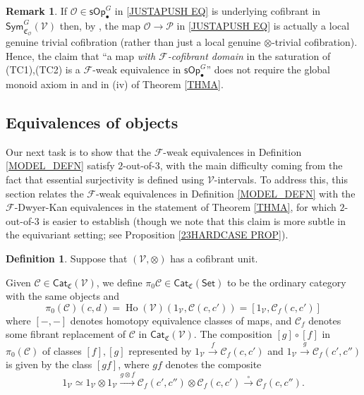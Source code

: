 \documentclass[a4paper,10pt
 ,final
]{article}%
\numberwithin{equation}{section}
\numberwithin{figure}{section}
\theoremstyle{definition} %
\newtheorem{definition}[equation]{Definition}%
\newtheorem{remark}[equation]{Remark}%
\newcommand{\Cat}{\mathsf{Cat}}
\DeclareMathOperator{\Ho}{Ho}
\newcommand{\F}{\ensuremath{\mathcal F}}
\newcommand{\V}{\ensuremath{\mathcal V}}
\renewcommand{\O}{\ensuremath{\mathcal O}}
\renewcommand{\P}{\ensuremath{\mathcal P}}
\newcommand{\1}{\ensuremath{\mathbbm 1}}%
\begin{document}
\begin{remark}\label{JCELLSM REM}
	If $\O \in \mathsf{sOp}^G_{\bullet}$
	in \eqref{JUSTAPUSH EQ}
	is underlying cofibrant in $\mathsf{Sym}^G_{\mathfrak{C}_{\O}}(\V)$
	then, by \cite[Rem. \ref{OC-THMISM REM}]{BP_FCOP},
	the map $\O \to \P$ in \eqref{JUSTAPUSH EQ}
	is actually a local genuine trivial cofibration 
	(rather than just a local genuine $\otimes$-trivial cofibration).
	Hence, the claim that 
	``a map \emph{with $\F$-cofibrant domain} in the saturation
	of (TC1),(TC2) is a $\F$-weak equivalence in
	$\mathsf{sOp}^G_{\bullet}$'' 
	does not require the global monoid axiom
	in \cite[Def. \ref{OC-GLOBMONAX_DEF}]{BP_FCOP}
	and in (iv) of Theorem \ref{THMA}.
\end{remark}







\subsection{Equivalences of objects}\label{EQUIVOBJ_SEC}


Our next task is to show that the
$\F$-weak equivalences
in Definition \ref{MODEL_DEFN}
satisfy $2$-out-of-$3$,
with the main difficulty coming 
from the fact that essential surjectivity is 
defined using $\V$-intervals.
%
To address this, this section relates the $\F$-weak equivalences
in Definition \ref{MODEL_DEFN} with the $\F$-Dwyer-Kan equivalences
in the statement of Theorem \ref{THMA},
for which $2$-out-of-$3$ is easier to establish
(though we note that this claim is more subtle in 
the equivariant setting;
see Proposition \ref{23HARDCASE PROP}).



\begin{definition}\label{HTPY_DEFN}
	Suppose that $(\V,\otimes)$ has a cofibrant unit.

	Given $\mathcal C \in \Cat_{\mathfrak{C}}(\V)$,
	we define $\pi_0 \mathcal C \in \Cat_{\mathfrak{C}}(\mathsf{Set})$ 
	to be the ordinary category with the same objects and
\[
	\pi_0(\mathcal{C})(c,d)=
	\Ho(\V)(1_\V, \mathcal C(c,c'))=
	[1_\V, \mathcal{C}_f(c,c')]
\]
where $[-,-]$ denotes homotopy equivalence classes of maps,
and $\mathcal{C}_f$ denotes some fibrant replacement of
$\mathcal C$ in $\Cat_{\mathfrak{C}}(\V)$.
The composition $[g]\circ [f]$
in $\pi_0(\mathcal{C})$
of classes $[f],[g]$
represented by
$1_{\mathcal{V}} \xrightarrow{f} \mathcal{C}_f({c,c'})$
and 
$1_{\mathcal{V}} \xrightarrow{g} \mathcal{C}_f({c',c''})$
is given by the class $[gf]$, where $gf$ denotes the composite
\begin{equation}\label{COMPI0 EQ}
1_{\mathcal{V}} \simeq
1_{\mathcal{V}} \otimes 1_{\mathcal{V}} \xrightarrow{g \otimes f}
\mathcal{C}_f({c',c''}) \otimes  \mathcal{C}_f({c,c'}) \xrightarrow{\circ}
\mathcal{C}_f({c,c''}).
\end{equation}
\end{definition}
\end{document}
